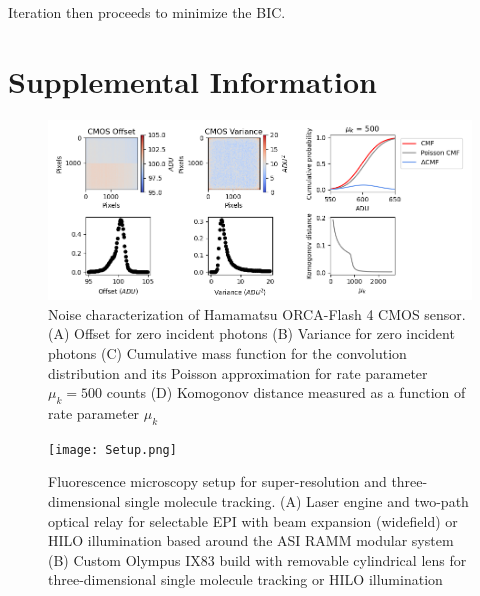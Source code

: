 \documentclass{ucetd}
\begin{document}
Iteration then proceeds to minimize the BIC.

\section{Supplemental Information}

\begin{figure}
\begin{center}
\includegraphics[width=16cm]{Noise.png}
\end{center}
\caption{Noise characterization of Hamamatsu ORCA-Flash 4 CMOS sensor. (A) Offset for zero incident photons (B) Variance for zero incident photons (C) Cumulative mass function for the convolution distribution and its Poisson approximation for rate parameter $\mu_{k} = 500$ counts (D) Komogonov distance measured as a function of rate parameter $\mu_{k}$}
\end{figure}

\begin{figure}
\begin{center}
\texttt{[image: Setup.png]}
\end{center}


\caption{Fluorescence microscopy setup for super-resolution and three-dimensional single molecule tracking. (A) Laser engine and two-path optical relay for selectable EPI with beam expansion (widefield) or HILO illumination based around the ASI RAMM modular system (B) Custom Olympus IX83 build with removable cylindrical lens for three-dimensional single molecule tracking or HILO illumination}
\end{figure}
\end{document}

